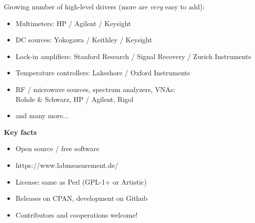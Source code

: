 \documentclass[portrait]{a0poster}
\newcommand{\lightblue}{\color{lightblue}}
\newcommand{\heading}[1]{
  {\color{heading}\boldmath\textbf{\huge #1}}\\[\medskipamount]
}
\begin{document}
{\begin{minipage}[t][\columnheighta-2\fboxsep-2\fboxrule][t]
\begin{minipage}{\textwidth}
\vspace*{1cm}
Growing number of high-level drivers (more are {\it very} easy to add):
{\large
\begin{itemize}
\item Multimeters: HP / Agilent / Keysight
\item DC sources: Yokogawa / Keithley / Keysight
\item Lock-in amplifiers: Stanford Research / Signal Recovery / Zurich Instruments
\item Temperature controllers: Lakeshore / Oxford Instruments
\item RF / microwave sources, spectrum analyzers, VNAs: \\ Rohde \& Schwarz, HP 
/ Agilent, Rigol
\item and many more...
\end{itemize}
}
\vspace*{1cm}
\heading{Key facts}
\vspace*{-2cm}
\begin{itemize}
 \item
 Open source / free software\\[-5cm]
 \item 
 {\lightblue https://www.labmeasurement.de/}
 \hfill{}
 \item
 License: same as Perl (GPL-1+ or Artistic)
 \item
 Releases on CPAN, development on Github
 \item
 Contributors and cooperations welcome!
\end{itemize}

%
%
%
\end{minipage}
\end{minipage}}
%
%
\end{document}
